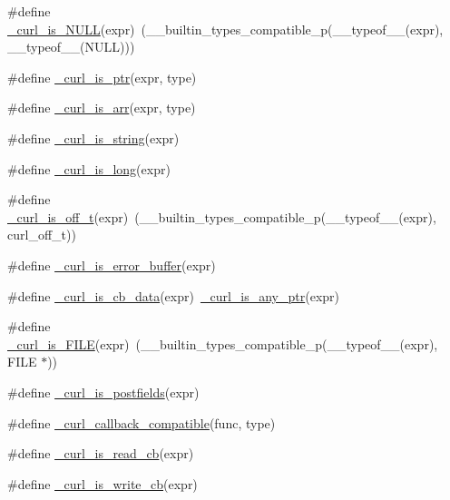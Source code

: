 \begin{DoxyCompactItemize}
\item 
\#define \hyperlink{typecheck-gcc_8h_a62558ae8dab69bab5b9267e95ffc1991}{\+\_\+curl\+\_\+is\+\_\+\+N\+U\+L\+L}(expr)~(\+\_\+\+\_\+builtin\+\_\+types\+\_\+compatible\+\_\+p(\+\_\+\+\_\+typeof\+\_\+\+\_\+(expr), \+\_\+\+\_\+typeof\+\_\+\+\_\+(N\+U\+L\+L)))
\item 
\#define \hyperlink{typecheck-gcc_8h_ad2e1376a037840f66b1bb1a2e71824b1}{\+\_\+curl\+\_\+is\+\_\+ptr}(expr,  type)
\item 
\#define \hyperlink{typecheck-gcc_8h_ab4b17ac3e1c0eccb2c7b7fd63fb07cb6}{\+\_\+curl\+\_\+is\+\_\+arr}(expr,  type)
\item 
\#define \hyperlink{typecheck-gcc_8h_a3b694a190dcf41d01e8e9cf3bcc85814}{\+\_\+curl\+\_\+is\+\_\+string}(expr)
\item 
\#define \hyperlink{typecheck-gcc_8h_abaaa49a9e8e8c55a4826b6e8c75785cd}{\+\_\+curl\+\_\+is\+\_\+long}(expr)
\item 
\#define \hyperlink{typecheck-gcc_8h_ad6728b9c1e253b78cad52c4a941b477d}{\+\_\+curl\+\_\+is\+\_\+off\+\_\+t}(expr)~(\+\_\+\+\_\+builtin\+\_\+types\+\_\+compatible\+\_\+p(\+\_\+\+\_\+typeof\+\_\+\+\_\+(expr), curl\+\_\+off\+\_\+t))
\item 
\#define \hyperlink{typecheck-gcc_8h_a7dea2a6ee1ed9843193c06b2fa932574}{\+\_\+curl\+\_\+is\+\_\+error\+\_\+buffer}(expr)
\item 
\#define \hyperlink{typecheck-gcc_8h_aabe122a7856e894514e8544629131449}{\+\_\+curl\+\_\+is\+\_\+cb\+\_\+data}(expr)~\hyperlink{typecheck-gcc_8h_a6262734b3ea5822848f25ead84674736}{\+\_\+curl\+\_\+is\+\_\+any\+\_\+ptr}(expr)
\item 
\#define \hyperlink{typecheck-gcc_8h_ab32e4635a06f3260ce2441fd3e8e4784}{\+\_\+curl\+\_\+is\+\_\+\+F\+I\+L\+E}(expr)~(\+\_\+\+\_\+builtin\+\_\+types\+\_\+compatible\+\_\+p(\+\_\+\+\_\+typeof\+\_\+\+\_\+(expr), F\+I\+L\+E $\ast$))
\item 
\#define \hyperlink{typecheck-gcc_8h_a1cd86a449c277f08900ac3e930cffe3d}{\+\_\+curl\+\_\+is\+\_\+postfields}(expr)
\item 
\#define \hyperlink{typecheck-gcc_8h_ab17970011d84bb174c2ad1e11361da88}{\+\_\+curl\+\_\+callback\+\_\+compatible}(func,  type)
\item 
\#define \hyperlink{typecheck-gcc_8h_a1d691b48d922594f30b3c66b3d71fc20}{\+\_\+curl\+\_\+is\+\_\+read\+\_\+cb}(expr)
\item 
\#define \hyperlink{typecheck-gcc_8h_ae471e53d5731bbf0e62d1157ba163e2d}{\+\_\+curl\+\_\+is\+\_\+write\+\_\+cb}(expr)
\item 

\end{DoxyCompactItemize}
